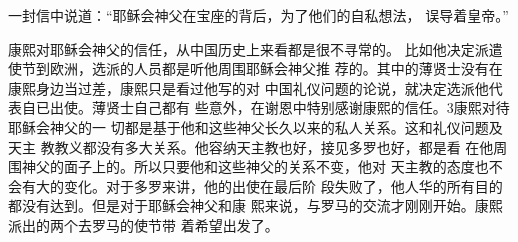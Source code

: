 一封信中说道：“耶稣会神父在宝座的背后，为了他们的自私想法，%
误导着皇帝。”%
\par
康熙对耶稣会神父的信任，从中国历史上来看都是很不寻常的。%
比如他决定派遣使节到欧洲，选派的人员都是听他周围耶稣会神父推%
荐的。其中的薄贤士没有在康熙身边当过差，康熙只是看过他写的对%
中国礼仪问题的论说，就决定选派他代表自已出使。薄贤士自己都有%
些意外，在谢恩中特别感谢康熙的信任。3康熙对待耶稣会神父的一%
切都是基于他和这些神父长久以来的私人关系。这和礼仪问题及天主%
教教义都没有多大关系。他容纳天主教也好，接见多罗也好，都是看%
在他周围神父的面子上的。所以只要他和这些神父的关系不变，他对%
天主教的态度也不会有大的变化。对于多罗来讲，他的出使在最后阶%
段失败了，他人华的所有目的都没有达到。但是对于耶稣会神父和康%
熙来说，与罗马的交流才刚刚开始。康熙派出的两个去罗马的使节带%
着希望出发了。%

